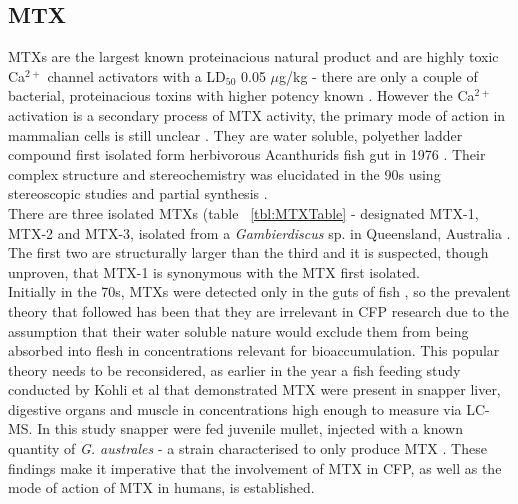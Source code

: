 \documentclass[12pt]{article}
\begin{document}
\subsection{MTX}

MTXs are the largest known proteinacious natural product \cite{yokoyama1988some,murata1993structure} and are highly toxic Ca$^{2+}$ channel activators with a LD$_{50}$ 0.05 $\mu$g/kg - there are only a couple of bacterial, proteinacious toxins with higher potency known \cite{yokoyama1988some,murata1993structure}. However the Ca$^{2+}$ activation is a secondary process of MTX activity, the primary mode of action in mammalian cells  is still unclear \cite{van2000diversity}. They are water soluble, polyether ladder compound first isolated form herbivorous Acanthurids fish gut in 1976 \cite{yasumoto1976toxicity}. Their complex structure and stereochemistry was elucidated in the 90s using stereoscopic studies and partial synthesis \cite{murata1993structure,murata1994structure,satake1995structural,nonomura1996complete,zheng1996complete}. \\
There are three isolated MTXs (table ~\ref{tbl:MTXTable} - designated MTX-1, MTX-2 and MTX-3, isolated from a \emph{Gambierdiscus} sp. in Queensland, Australia \cite{holmes1994purification}. The first two are structurally larger than the third and it is suspected, though unproven, that MTX-1 is synonymous with the MTX first isolated. \\ %
Initially in the 70s, MTXs were detected only in the guts of fish \cite{yasumoto1976toxicity}, so the prevalent theory that followed has been that they are irrelevant in CFP research due to the assumption that their water soluble nature would exclude them from being absorbed into flesh in concentrations relevant for bioaccumulation. This popular theory needs to be reconsidered, as earlier in the year a fish feeding study conducted by Kohli et al that demonstrated MTX were present in snapper liver, digestive organs and muscle in concentrations high enough to measure via LC-MS. In this study snapper were fed juvenile mullet, injected with a known quantity of \emph{G. australes} - a strain characterised to only produce MTX \cite{kohli2014feeding}. These findings make it imperative that the involvement of MTX in CFP, as well as the mode of action of MTX in humans, is established. 

\end{document}
